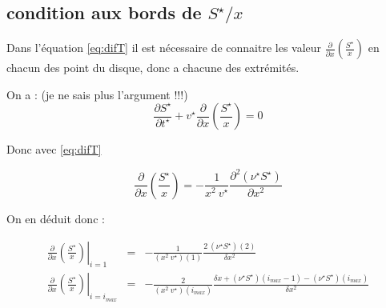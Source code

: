 \subsection{condition aux bords de $S^{\star}/x$}

Dans l'équation \eqref{eq:difT} il est nécessaire de connaitre les valeur $\frac{\partial}{\partial x}\left(\frac{S^{\star}}{x}\right)$ en chacun des point du disque, donc a chacune des extrémités. 

On a : (je ne sais plus l'argument !!!)
\begin{equation}
  \frac{\partial S^{\star}}{\partial t^{\star}} + v^{\star} \frac{\partial}{\partial x} \left(\frac{S^{\star}}{x}\right)=0
\end{equation}

Donc avec \eqref{eq:difT}

\begin{equation}
  \frac{\partial}{\partial x} \left(\frac{S^{\star}}{x}\right) = -\frac{1}{x^2\ v^{\star}} \frac{\partial^2 (\nu^{\star} S^{\star})}{\partial x^2}
\end{equation}

On en déduit donc :

\begin{eqnarray}
  \left. \frac{\partial}{\partial x} \left(\frac{S^{\star}}{x}\right) \right|_{i=1 }&=& - \frac{1}{(x^2\ v^{\star})(1)} \frac{2\ (\nu^{\star} S^{\star})(2)}{\delta x ^2} \\
  \left. \frac{\partial}{\partial x} \left(\frac{S^{\star}}{x}\right) \right|_{i=i_{max}} &=& - \frac{2}{(x^2\ v^{\star})(i_{max})} \frac{\delta x + (\nu^{\star} S^{\star})(i_{max}-1)- (\nu^{\star} S^{\star})(i_{max})}{\delta x^2}
\end{eqnarray}
